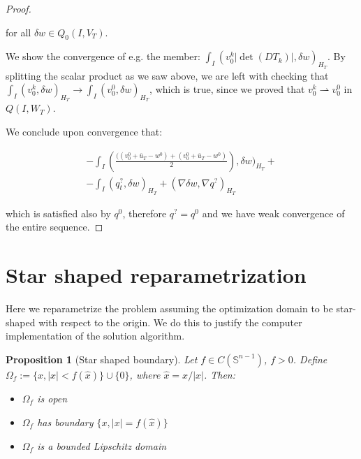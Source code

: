 \documentclass[english,a4paper,10pt,oneside]{scrbook}	%
\theoremstyle{break}
\newtheorem{prop}[equation]{Proposition}
\newenvironment{mproof}[1][\proofname]{%
  \begin{proof}[#1]$ $\par\nobreak\ignorespaces
}{%
  \end{proof}
}
\renewcommand*{\proofname}{Proof}
\theoremstyle{remark}
\newcommand{\mS}{\mathbb{S}^{n-1}}
\newcommand{\weakc}{\rightharpoonup}
\newcommand{\xh}{\hat{x}}
\begin{document}
\begin{mproof}
for all $\delta w \in Q_0(I,V_{ T})$.

We show the convergence of e.g. the member: $\int_I( v_0^k|\det(DT_k)|,\delta w)_{H_T}$. By splitting the scalar product as we saw above, we are left with checking that $\int_I (v_0^k,\delta w)_{H_T}\rightarrow  \int_I (v_0^0,\delta w)_{H_T}$, which is true, since we proved that $v_0^k \weakc v_0^0$ in $Q(I,W_T)$.

We conclude upon convergence that:

\begin{align*}
-\int_I \left (\frac{((v_0^0+\bar{u}_T - w^0)+(v_0^0+\bar{u}_T - w^0)}{2}\right ),\delta w)_{H_T}+\\
-\int_I (  q^?_t ,   \delta w )_{H_T}+ (\nabla \delta w, \nabla q^?)_{H_T}
\end{align*}

which is satisfied also by $q^0$, therefore $q^? = q^0$ and we have weak convergence of the entire sequence.

\end{mproof}

\section{Star shaped reparametrization}

Here we reparametrize the problem assuming the optimization domain to be star-shaped with respect to the origin. We do this to justify the computer implementation of the solution algorithm.

\begin{prop}[Star shaped boundary]
Let $f \in C(\mS)$, $f>0$. Define $\Omega_f:=\{x, |x|<f(\xh)\}\cup\{0\}$, where $\xh=x/|x|$. Then:
\begin{itemize}
\item $\Omega_f$ is open
\item $\Omega_f$ has boundary $\{x, |x|=f(\xh)\}$
\item $\Omega_f$ is a bounded Lipschitz domain
\end{itemize}
\end{prop}
\end{document}
